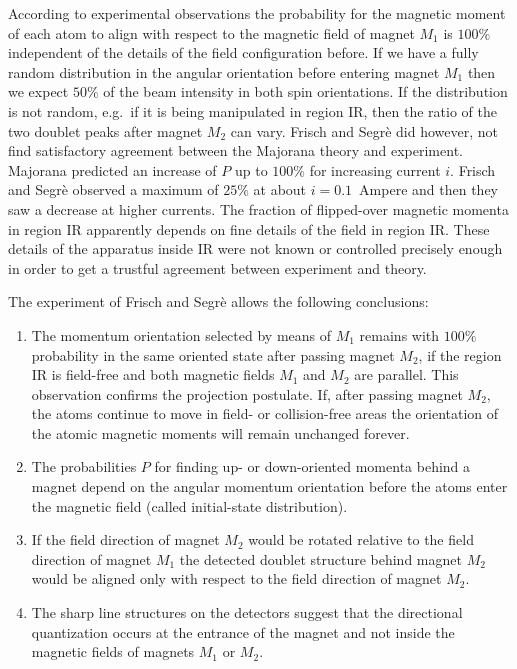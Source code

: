 \documentclass{article}
\begin{document}
According to experimental observations the probability for the magnetic moment of each atom to align with respect to the magnetic field of magnet $M_1$ is $100\%$ independent of the details of the field configuration before. If we have a fully random distribution in the angular orientation before entering magnet $M_1$ then we expect $50\%$ of the beam intensity in both spin orientations. If the distribution is not random, e.g.\ if it is being manipulated in region IR, then the ratio of the two doublet peaks after magnet $M_2$ can vary. Frisch and Segrè did however, not find satisfactory agreement between the Majorana theory and experiment. Majorana predicted an increase of $P$ up to $100\%$ for increasing current $i$. Frisch and Segrè observed a maximum of $25\%$ at about $i=0.1$~Ampere and then they saw a decrease at higher currents. The fraction of flipped-over magnetic momenta in region IR apparently depends on fine details of the field in region IR. These details of the apparatus inside IR were not known or controlled precisely enough in order to get a trustful agreement between experiment and theory.

The experiment of Frisch and Segrè allows the following conclusions: 
\begin{enumerate}
\item The momentum orientation selected by means of $M_1$ remains with $100\%$ probability in the same oriented state after passing magnet $M_2$, if the region IR is field-free and both magnetic fields $M_1$ and $M_2$ are parallel. This observation confirms the projection postulate. If, after passing magnet $M_2$, the atoms continue to move in field- or collision-free areas the orientation of the atomic magnetic moments will remain unchanged forever. 
\item The probabilities $P$ for finding up- or down-oriented momenta behind a magnet depend on the angular momentum orientation before the atoms enter the magnetic field (called initial-state distribution). 
\item If the field direction of magnet $M_2$ would be rotated relative to the field direction of magnet $M_1$ the detected doublet structure behind magnet $M_2$ would be aligned only with respect to the field direction of magnet $M_2$. 
\item The sharp line structures on the detectors suggest that the directional quantization occurs at the entrance of the magnet and not inside the magnetic fields of magnets $M_1$ or $M_2$. 
\end{enumerate}
\end{document}
